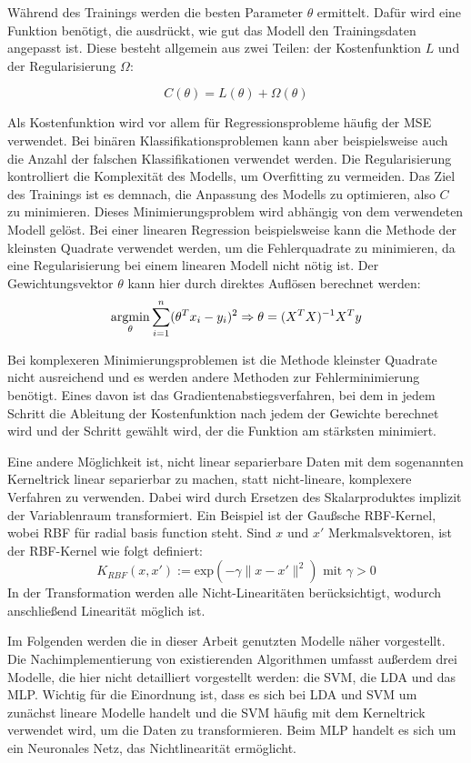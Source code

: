 		Während des Trainings werden die besten Parameter $\theta$ ermittelt. Dafür wird eine Funktion benötigt, die ausdrückt, wie gut das Modell den Trainingsdaten angepasst ist. Diese besteht allgemein aus zwei Teilen: der Kostenfunktion $L$ und der Regularisierung $\Omega$:
		
		\[
			C(\theta)= L(\theta) + \Omega(\theta)
		\]
		
		Als Kostenfunktion wird vor allem für Regressionsprobleme häufig der \ac{MSE} verwendet. Bei binären Klassifikationsproblemen kann aber beispielsweise auch die Anzahl der falschen Klassifikationen verwendet werden. Die Regularisierung kontrolliert die Komplexität des Modells, um Overfitting zu vermeiden. Das Ziel des Trainings ist es demnach, die Anpassung des Modells zu optimieren, also $C$ zu minimieren. Dieses Minimierungsproblem wird abhängig von dem verwendeten Modell gelöst. Bei einer linearen Regression beispielsweise kann die Methode der kleinsten Quadrate verwendet werden, um die Fehlerquadrate zu minimieren, da eine Regularisierung bei einem linearen Modell nicht nötig ist. Der Gewichtungsvektor $\theta$ kann hier durch direktes Auflösen berechnet werden:
		\[
			\operatorname*{argmin}_{\theta} \sum_{i=1}^{n} (\theta^T x_i - y_i)^2
			\Rightarrow \theta = (X^T X)^{-1} X^Ty
		\]
		
		Bei komplexeren Minimierungsproblemen ist die Methode kleinster Quadrate nicht ausreichend und es werden andere Methoden zur Fehlerminimierung benötigt. Eines davon ist das Gradientenabstiegsverfahren, bei dem in jedem Schritt die Ableitung der Kostenfunktion nach jedem der Gewichte berechnet wird und der Schritt gewählt wird, der die Funktion am stärksten minimiert.
		
		Eine andere Möglichkeit ist, nicht linear separierbare Daten mit dem sogenannten Kerneltrick linear separierbar zu machen, statt nicht-lineare, komplexere Verfahren zu verwenden. Dabei wird durch Ersetzen des Skalarproduktes implizit der Variablenraum transformiert. Ein Beispiel ist der Gaußsche RBF-Kernel, wobei RBF für radial basis function steht. Sind $x$ und $x'$ Merkmalsvektoren, ist der RBF-Kernel wie folgt definiert:
		\[
			K_{RBF} (x, x\prime) := \text{exp}(-\gamma \|x - x\prime\|^2) \text{ mit } \gamma > 0
		\]
		In der Transformation werden alle Nicht-Linearitäten berücksichtigt, wodurch anschließend Linearität möglich ist. %
		
		Im Folgenden werden die in dieser Arbeit genutzten Modelle näher vorgestellt. Die Nachimplementierung von existierenden Algorithmen umfasst außerdem drei Modelle, die hier nicht detailliert vorgestellt werden: die \ac{SVM}, die \ac{LDA} und das \ac{MLP}. Wichtig für die Einordnung ist, dass es sich bei \ac{LDA} und \ac{SVM} um zunächst lineare Modelle handelt und die \ac{SVM} häufig mit dem Kerneltrick verwendet wird, um die Daten zu transformieren. Beim \ac{MLP} handelt es sich um ein Neuronales Netz, das Nichtlinearität ermöglicht.

